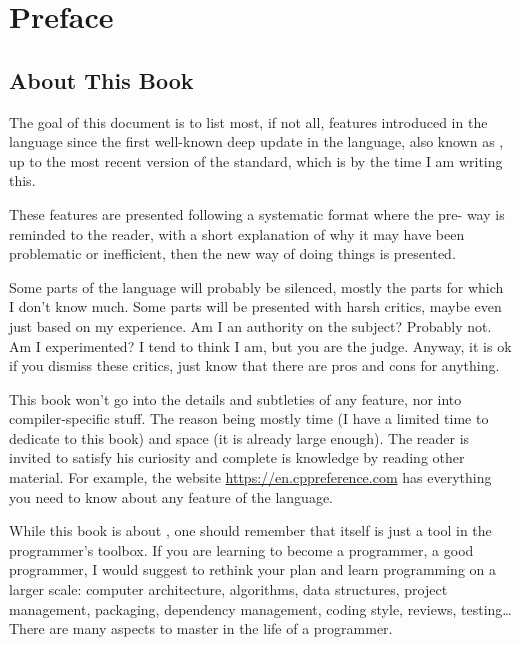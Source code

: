 \chapter{Preface}
\renewcommand*\thesection{\arabic{section}}

\section{About This Book}
The goal of this document is to list most, if not all, features
introduced in the \cpp language since the first well-known deep update
in the language, also known as , up to the most recent version
of the standard, which is  by the time I am writing this.

These features are presented following a systematic format where the
pre- way is reminded to the reader, with a short explanation of
why it may have been problematic or inefficient, then the new way of
doing things is presented.

Some parts of the language will probably be silenced, mostly the parts
for which I don't know much. Some parts will be presented with harsh
critics, maybe even just based on my experience. Am I an authority on
the subject? Probably not. Am I experimented? I tend to think I am,
but you are the judge. Anyway, it is ok if you dismiss these critics,
just know that there are pros and cons for anything.

This book won't go into the details and subtleties of any feature, nor
into compiler-specific stuff. The reason being mostly time (I have a
limited time to dedicate to this book) and space (it is already large
enough). The reader is invited to satisfy his curiosity and complete
is knowledge by reading other material. For example, the website
\url{https://en.cppreference.com} has everything you need to know
about any feature of the language.

\bigskip

While this book is about \cpp, one should remember that \cpp{} itself
is just a tool in the programmer's toolbox. If you are learning \cpp{}
to become a programmer, a good programmer, I would suggest to rethink
your plan and learn programming on a larger scale: computer
architecture, algorithms, data structures, project management,
packaging, dependency management, coding style, reviews, testing…
There are many aspects to master in the life of a programmer.

